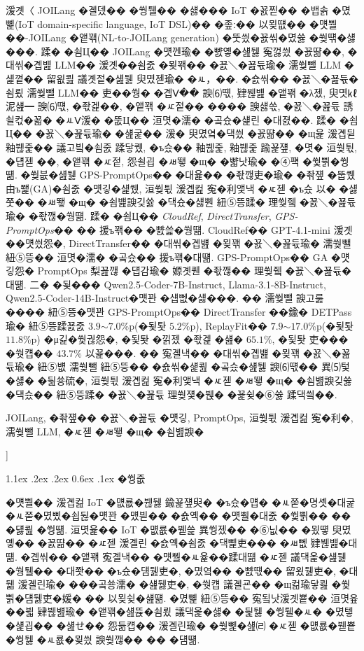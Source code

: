 \documentclass[10pt,twocolumn]{article}
\makeatletter
\renewcommand{\section}{\@startsection{section}{1}{\z@}%
{1.1ex \@plus .2ex \@minus .2ex}%
{0.6ex \@plus .1ex}%
{\normalfont\normalsize\bfseries}}
\makeatother
\begin{document}
\begin{@twocolumnfalse}
\noindent{\bf [��\ ��]}
湲곗〈 JOILang �곌뎄�� �쒕퉬�� �섏��� IoT �꾨찓�� �뱁솕 �몄뼱(IoT domain-specific language, IoT DSL)�� �좊ː�� 以묒떖�� �먯뿰��-JOILang �앹꽦(NL-to-JOILang generation) �뚯씠�꾨씪�몄쓣 �쒖떆�섏���. 蹂� �쇰Ц�� JOILang �먯껜瑜� �뺤옣�섎뒗 寃껋씠 �꾨땲��, �대씪�곕뱶 LLM�� 湲곗��쇰줈 �묒꽦�� �꾨＼�꾪듃瑜� 濡쒖뺄 LLM �섍꼍�� 留욊쾶 議곗젙�섎뒗 臾몄젣瑜� �ㅻ，��. �숈씪�� �꾨＼�꾪듃�쇰룄 濡쒖뺄 LLM�� 吏��쒕� �곕Ⅴ�� 諛⑹떇, 肄붾뱶 �앹꽦 �λ젰, 臾몃㎘ 泥섎━ 諛⑹떇, �좏겙��, �앹꽦 �ㅼ젙�� ���� 諛섏쓳, �꾨＼�꾪듃 誘쇨컧�꾧� �ㅻⅤ湲� �뚮Ц�� 洹몃�濡� �곸슜�섍린 �대졄��. 蹂� �쇰Ц�� �꾨＼�꾪듃瑜� �섎굹�� 湲� 臾몄옄�댁씠 �꾨땲�� �щ윭 湲곕뒫 釉붾줉�� 議고빀�쇰줈 蹂닿퀬, �ъ슜�� 釉붾줉, 釉붾줉 踰꾩쟾, �몃� 洹쒖튃, �덉젣 ��, �앹꽦 �ㅼ젙, 怨쇨굅 �ㅽ뙣 �щ� �뺣낫瑜� �④퍡 �쒗쁽�쒕떎. �쒖븞�섎뒗 GPS-PromptOps�� �대윭�� �좏깮吏�瑜� �좎쟾 �뚭퀬由ъ쬁(GA)�쇰줈 �먯깋�섍퀬, 洹쒖튃 湲곕컲 寃�利앷낵 �ㅼ젣 �ъ슜 以� �섏쭛�� �ㅽ뙣 �щ� �쇰뱶諛깆쓣 �댁슜�섏뿬 紐⑤뜽蹂� 理쒖쥌 �꾨＼�꾪듃瑜� �좏깮�쒕떎. 蹂� �쇰Ц�� \emph{CloudRef}, \emph{DirectTransfer}, \emph{GPS-PromptOps}�� �� 援ъ꽦�� �뺤쓽�쒕떎. CloudRef�� GPT-4.1-mini 湲곗��먯씠怨�, DirectTransfer�� �대씪�곕뱶 �묒꽦 �꾨＼�꾪듃瑜� 濡쒖뺄 紐⑤뜽�� 洹몃�濡� �곸슜�� 援ъ꽦�대떎. GPS-PromptOps�� GA �먯깋怨� PromptOps 梨꾪깮 �덉감瑜� 嫄곗퀜 �좏깮�� 理쒖쥌 �꾨＼�꾪듃�대떎. 二� �됯��� Qwen2.5-Coder-7B-Instruct, Llama-3.1-8B-Instruct, Qwen2.5-Coder-14B-Instruct�먯꽌 �섑뻾�섏���. �� 濡쒖뺄 諛고룷 ���� 紐⑤뜽�먯꽌 GPS-PromptOps�� DirectTransfer ��鍮� DETPass瑜� 紐⑤뜽蹂꾨줈 $3.9$$\sim$$7.0$\%p(�됯퇏 $5.2$\%p), ReplayFit�� $7.9$$\sim$$17.0$\%p(�됯퇏 $11.8$\%p) �μ긽�쒗궎怨�, �됯퇏 �낅젰 �좏겙 �섎� $65.1\%$, �됯퇏 吏��� �쒓컙�� $43.7\%$ 以꾩���. �� 寃곌낵�� �대씪�곕뱶 �묒꽦 �꾨＼�꾪듃瑜� 紐⑤뱺 濡쒖뺄 紐⑤뜽�� �숈씪�섍쾶 �곸슜�섎뒗 諛⑹떇�� 異⑸텇�섏� �딆쑝硫�, 洹쒖튃 湲곕컲 寃�利앷낵 �ㅼ젣 �ㅽ뙣 �щ� �쇰뱶諛깆쓣 �댁슜�� 紐⑤뜽蹂� �꾨＼�꾪듃 理쒖쟻�붽� �꾩슂�⑥쓣 蹂댁씤��.


\vspace{0.25em}
 JOILang, �좎쟾�� �꾨＼�꾪듃 �먯깋, PromptOps, 洹쒖튃 湲곕컲 寃�利�, 濡쒖뺄 LLM, �ㅼ젣 �ㅽ뙣 �щ� �쇰뱶諛�

\vspace{0.8em}
\end{@twocolumnfalse}
]


\section{�쒕줎}

�먯뿰�� 湲곕컲 IoT �먮룞�붾뒗 鍮꾩쟾臾� �ъ슜�먭� �ㅻ쭏�명솃�대굹 �ㅻ쭏�몄삤�쇱뒪�먯꽌 �먰븯�� �숈옉�� �먯뿰�대줈 �쒗쁽�� �� �덇쾶 �쒕떎. 洹몃윭�� IoT �먮룞�붿쓽 異쒕젰�� �⑥닚�� �묐떟 臾몄옣�� �꾨땲�� �ㅼ젣 湲곌린 �숈옉�쇰줈 �댁뼱吏��� �ㅽ뻾 肄붾뱶�대떎. �곕씪�� �앹꽦 寃곌낵�� �먯뿰�ㅻ윭��蹂대떎 �ㅼ젣 議댁옱�섎뒗 �쒕퉬�� �대쫫�� �ъ슜�덈뒗吏�, �몄옄�� �뺤떇�� 留욌뒗吏�, �대뒓 湲곌린瑜� ���곸쑝濡� �섎뒗吏�, �쒓컙 議곌굔�� �щ컮瑜닿쾶 �쒗쁽�덈뒗吏�媛� �� 以묒슂�섎떎. �몄뼱 紐⑤뜽�� 寃됰낫湲곗뿉�� 洹몃윺��븳 肄붾뱶瑜� �앹꽦�섎뜑�쇰룄 議댁옱�섏� �딅뒗 �쒕퉬�ㅻ� �몄텧�섍굅�� �섎せ�� 怨듦컙�� 湲곌린瑜� �쒖뼱�섎㈃ �ㅼ젣 �먮룞�붿뿉�쒕뒗 �ㅻ룞�묒씠 諛쒖깮�� �� �덈떎.
\end{document}
